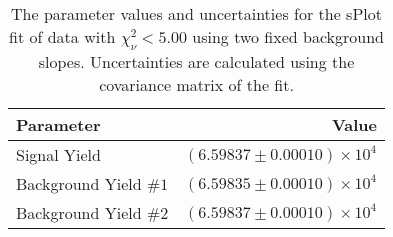 
\begin{table}[ht]
    \begin{center}
        \begin{tabular}{lr}\toprule
            Parameter & Value \\\midrule
            Signal Yield & $(6.59837 \pm 0.00010) \times 10^{4}$ \\
            Background Yield $\#1$ & $(6.59835 \pm 0.00010) \times 10^{4}$ \\
            Background Yield $\#2$ & $(6.59837 \pm 0.00010) \times 10^{4}$ \\\bottomrule
        \end{tabular}
        \caption{The parameter values and uncertainties for the sPlot fit of data with $\chi^2_\nu < 5.00$ using two fixed background slopes. Uncertainties are calculated using the covariance matrix of the fit.}\label{tab:splot-fit-results-chisqdof-5.00-fixed-2}
    \end{center}
\end{table}
